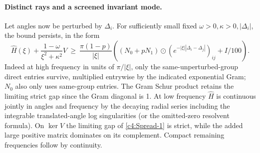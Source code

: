 \paragraph{Distinct rays and a screened invariant mode.} Let angles now be perturbed by \(\Delta_i\). For sufficiently small fixed \(\omega>0,\kappa>0,|\Delta_i|\), the bound persists, in the form
\begin{equation}
 \widehat H(\xi)+\frac{1-\omega}{\xi^2+\kappa^2} V\ \ge\
 \frac{\pi(1-p)}{|\xi|}\left((N_0+pN_1)\odot(e^{-|\xi||\Delta_i-\Delta_j|})_{ij}+ I/100\right).        \label{c4:Spread-2}
\end{equation}
Indeed at high frequency in units of \(\pi/|\xi|\), only the same-unperturbed-group direct entries survive, multiplied entrywise by the indicated exponential Gram; \(N_0\) also only uses same-group entries. The Gram Schur product retains the limiting strict gap since the Gram diagonal is 1. At low frequency \(\widehat H\) is continuous jointly in angles and frequency by the decaying radial series including the integrable translated-angle log singularities (or the omitted-zero resolvent formula). On \(\ker V\) the limiting gap of \eqref{c4:Spread-1} is strict, while the added large positive matrix dominates on its complement. Compact remaining frequencies follow by continuity.


